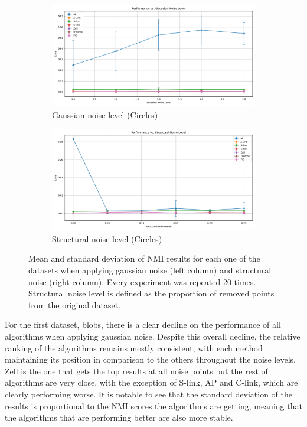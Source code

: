 \documentclass[
	10pt,
	parskip=half-,	
	paper=a4,
	english
	]{scrartcl}
\begin{document}
\begin{figure}[h!]
    \begin{subfigure}[b]{0.45\textwidth}
        \includegraphics[width=\textwidth]{../data/plots/results_gaussian_noise_circles.png}
        \caption{Gaussian noise level (Circles)}
    \end{subfigure}
    \begin{subfigure}[b]{0.45\textwidth}
        \includegraphics[width=\textwidth]{../data/plots/results_structural_noise_circles.png}
        \caption{Structural noise level (Circles)}
    \end{subfigure}

    \caption{Mean and standard deviation of NMI results for each one of the datasets when applying gaussian noise (left column) and structural noise (right column). Every experiment was repeated 20 times. Structural noise level is defined as the proportion of removed points from the original dataset.}
    \label{fig:noise_analysis}
\end{figure}

For the first dataset, blobs, there is a clear decline on the performance of all algorithms when applying gaussian noise. Despite this overall decline, the relative ranking of the algorithms remains mostly consistent, with each method maintaining its position in comparison to the others throughout the noise levels. Zell is the one that gets the top results at all noise points but the rest of algorithms are very close, with the exception of S-link, AP and C-link, which are clearly performing worse. It is notable to see that the standard deviation of the results is proportional to the NMI scores the algorithms are getting, meaning that the algorithms that are performing better are also more stable.
\end{document}
